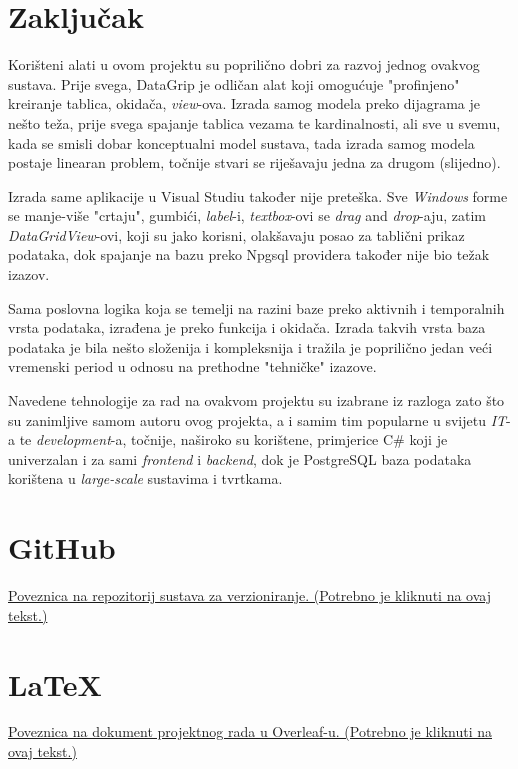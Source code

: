\documentclass[]{foi} %
\begin{document}
\chapter{Zaključak}

Korišteni alati u ovom projektu su poprilično dobri za razvoj jednog ovakvog sustava. Prije svega, DataGrip je odličan alat koji omogućuje "profinjeno" kreiranje tablica, okidača, \textit{view}-ova. Izrada samog modela preko dijagrama je nešto teža, prije svega spajanje tablica vezama te kardinalnosti, ali sve u svemu, kada se smisli dobar konceptualni model sustava, tada izrada samog modela postaje linearan problem, točnije stvari se riješavaju jedna za drugom (slijedno).

Izrada same aplikacije u Visual Studiu također nije preteška. Sve \textit{Windows} forme se manje-više "crtaju", gumbići, \textit{label}-i, \textit{textbox}-ovi se \textit{drag} and \textit{drop}-aju, zatim \textit{DataGridView}-ovi, koji su jako korisni, olakšavaju posao za tablični prikaz podataka, dok spajanje na bazu preko Npgsql providera također nije bio težak izazov.

Sama poslovna logika koja se temelji na razini baze preko aktivnih i temporalnih vrsta podataka, izrađena je preko funkcija i okidača. Izrada takvih vrsta baza podataka je bila nešto složenija i kompleksnija i tražila je poprilično jedan veći vremenski period u odnosu na prethodne "tehničke" izazove.

Navedene tehnologije za rad na ovakvom projektu su izabrane iz razloga zato što su zanimljive samom autoru ovog projekta, a i samim tim popularne u svijetu \textit{IT}-a te \textit{development}-a, točnije, naširoko su korištene, primjerice C\# koji je univerzalan i za sami \textit{frontend} i \textit{backend}, dok je PostgreSQL baza podataka korištena u \textit{large-scale} sustavima i tvrtkama.

\makebackmatter

\appendices %

\chapter{GitHub} %

\href{https://github.com/pmatisic/rentacar}{Poveznica na repozitorij sustava za verzioniranje. (Potrebno je kliknuti na ovaj tekst.)}

\chapter{\LaTeX} %

\href{https://www.overleaf.com/read/kgwkpshxjjvy}{Poveznica na dokument projektnog rada u Overleaf-u. (Potrebno je kliknuti na ovaj tekst.)}
\end{document}
